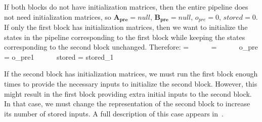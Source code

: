     If both blocks do not have initialization matrices, then the entire
pipeline does not need initialization matrices, so
$\mathbf{A_{pre}} = null$, $\mathbf{B_{pre}} = null$, $o_{pre} =
0$, $stored = 0$. If only the first block has initialization
matrices, then we want to initialize the states in the pipeline
corresponding to the first block while keeping the states
corresponding to the second block unchanged. Therefore:
\starteqnstar
{} =  ~~~~~
 =  ~~~~~
o_{pre} = o_{pre1} ~~~~~
stored = stored_1
\doneeqnstar

    If the second block has initialization matrices, we must run the
first block enough times to provide the necessary inputs to initialize
the second block. However, this might result in the first block
providing extra initial inputs to the second block. In that case, we
must change the representation of the second block to increase its
number of stored inputs.  A full description of this case appears
in~\cite{Agrawal04}.


